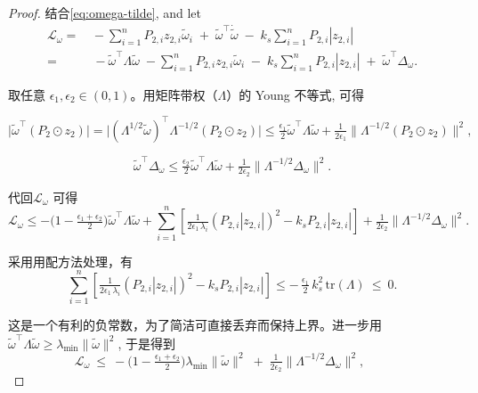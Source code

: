\documentclass[pdflatex,sn-mathphys-num]{sn-jnl}%
\theoremstyle{thmstyleone}%
\theoremstyle{thmstyletwo}%
\theoremstyle{thmstylethree}%
\begin{document}
\begin{proof}


结合\cref{eq:omega-tilde}, and let
\begin{equation}\label{eq:50}
	\begin{aligned}
\mathcal{L}_\omega
=&\,-\sum_{i=1}^nP_{2,i}z_{2,i}\tilde{\omega}_i\;+\;\tilde \omega^\top \dot{\tilde \omega}\;-\;k_s\sum_{i=1}^n P_{2,i} | z_{2,i} |  \\
=&\;-\tilde\omega^\top\Lambda\tilde\omega\;-\sum_{i=1}^nP_{2,i}z_{2,i}\tilde\omega_i\;-\;k_s\sum_{i=1}^n P_{2,i} | z_{2,i} |\;+\;\tilde\omega^\top\Delta_\omega .
\end{aligned}
\end{equation}

取任意 $\epsilon_1,\epsilon_2\in(0,1)$。用矩阵带权（$\Lambda$）的 Young 不等式, 可得

$$
\big|\tilde\omega^\top(P_2\!\odot z_2)\big|
=\big|(\Lambda^{1/2}\tilde\omega)^\top\Lambda^{-1/2}(P_2\!\odot z_2)\big|
\le \tfrac{\epsilon_1}{2}\tilde\omega^\top\Lambda\tilde\omega
+ \tfrac{1}{2\epsilon_1}\big\|\Lambda^{-1/2}(P_2\!\odot z_2)\big\|^2,
$$

$$
\tilde\omega^\top\Delta_\omega
\le \tfrac{\epsilon_2}{2}\tilde\omega^\top\Lambda\tilde\omega
+\tfrac{1}{2\epsilon_2}\big\|\Lambda^{-1/2}\Delta_\omega\big\|^2 .
$$

代回$\mathcal{L}_\omega$ 可得
$$
\mathcal{L}_\omega
\le
-\Big(1-\tfrac{\epsilon_1+\epsilon_2}{2}\Big)\tilde\omega^\top\Lambda\tilde\omega
+\sum_{i=1}^n\!\left[\tfrac{1}{2\epsilon_1\,\lambda_{i}}(P_{2,i}|z_{2,i}|)^2
- k_s P_{2,i}|z_{2,i}|\right]
+\tfrac{1}{2\epsilon_2}\big\|\Lambda^{-1/2}\Delta_\omega\big\|^2 .
$$

采用用配方法处理，有
$$
\sum_{i=1}^n\!\left[\tfrac{1}{2\epsilon_1\,\lambda_{i}}(P_{2,i}|z_{2,i}|)^2
- k_s P_{2,i}|z_{2,i}|\right]
\le -\,\tfrac{\epsilon_1}{2}\,k_s^2\,\mathrm{tr}(\Lambda)\ \le\ 0.
$$

这是一个有利的负常数，为了简洁可直接丢弃而保持上界。进一步用 $\tilde\omega^\top\Lambda\tilde\omega\ge \lambda_{\min}\|\tilde\omega\|^2$, 于是得到
$$
\mathcal{L}_\omega
\ \le\
-\Big(1-\tfrac{\epsilon_1+\epsilon_2}{2}\Big)\lambda_{\min}\|\tilde\omega\|^2
\;+\;\tfrac{1}{2\epsilon_2}\big\|\Lambda^{-1/2}\Delta_\omega\big\|^2,\qquad
$$







\end{proof}
\end{document}
